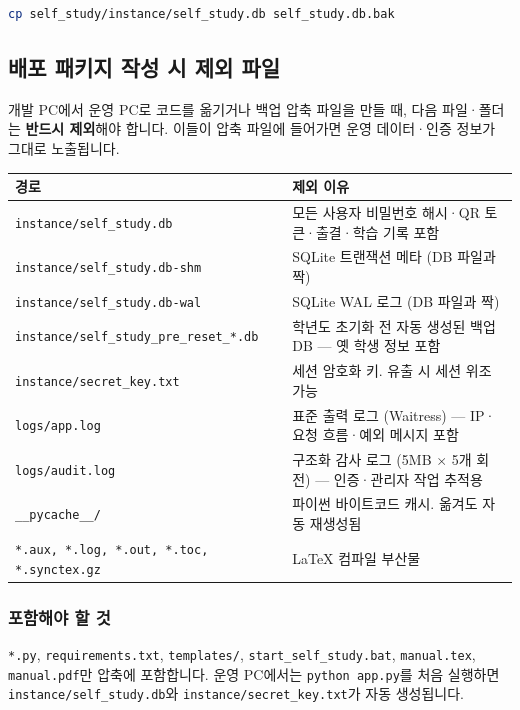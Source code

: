 \documentclass[a4paper,12pt]{article}
\begin{document}
\begin{lstlisting}[language=bash, caption=백업 예시 (macOS/Linux)]
cp self_study/instance/self_study.db self_study.db.bak
\end{lstlisting}

\subsection{배포 패키지 작성 시 제외 파일}

개발 PC에서 운영 PC로 코드를 옮기거나 백업 압축 파일을 만들 때,
다음 파일·폴더는 \textbf{반드시 제외}해야 합니다.
이들이 압축 파일에 들어가면 운영 데이터·인증 정보가 그대로 노출됩니다.

\begin{center}
\begin{tabularx}{\textwidth}{lX}
\toprule
\textbf{경로} & \textbf{제외 이유} \\
\midrule
\texttt{instance/self\_study.db}        & 모든 사용자 비밀번호 해시·QR 토큰·출결·학습 기록 포함 \\
\texttt{instance/self\_study.db-shm}    & SQLite 트랜잭션 메타 (DB 파일과 짝) \\
\texttt{instance/self\_study.db-wal}    & SQLite WAL 로그 (DB 파일과 짝) \\
\texttt{instance/self\_study\_pre\_reset\_*.db} & 학년도 초기화 전 자동 생성된 백업 DB --- 옛 학생 정보 포함 \\
\texttt{instance/secret\_key.txt}        & 세션 암호화 키. 유출 시 세션 위조 가능 \\
\texttt{logs/app.log}                    & 표준 출력 로그 (Waitress) — IP·요청 흐름·예외 메시지 포함 \\
\texttt{logs/audit.log}                  & 구조화 감사 로그 (5MB $\times$ 5개 회전) — 인증·관리자 작업 추적용 \\
\texttt{\_\_pycache\_\_/}                & 파이썬 바이트코드 캐시. 옮겨도 자동 재생성됨 \\
\texttt{*.aux, *.log, *.out, *.toc, *.synctex.gz} & LaTeX 컴파일 부산물 \\
\bottomrule
\end{tabularx}
\end{center}

\subsubsection*{포함해야 할 것}

\texttt{*.py}, \texttt{requirements.txt}, \texttt{templates/}, \texttt{start\_self\_study.bat},
\texttt{manual.tex}, \texttt{manual.pdf}만 압축에 포함합니다.
운영 PC에서는 \texttt{python app.py}를 처음 실행하면
\texttt{instance/self\_study.db}와 \texttt{instance/secret\_key.txt}가 자동 생성됩니다.
\end{document}
